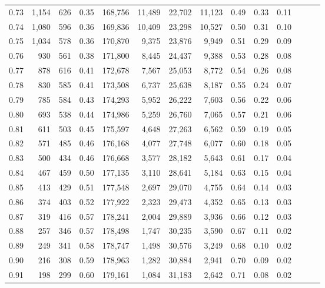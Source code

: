 \begin{tabular}{rrrrrrrrrrrrrr}
0.73 &  1,154 &  626 &  0.35 &  168,756 &   11,489 &  22,702 &  11,123 &  0.49 &  0.33 &      0.11 \\
0.74 &  1,080 &  596 &  0.36 &  169,836 &   10,409 &  23,298 &  10,527 &  0.50 &  0.31 &      0.10 \\
0.75 &  1,034 &  578 &  0.36 &  170,870 &    9,375 &  23,876 &   9,949 &  0.51 &  0.29 &      0.09 \\
0.76 &    930 &  561 &  0.38 &  171,800 &    8,445 &  24,437 &   9,388 &  0.53 &  0.28 &      0.08 \\
0.77 &    878 &  616 &  0.41 &  172,678 &    7,567 &  25,053 &   8,772 &  0.54 &  0.26 &      0.08 \\
0.78 &    830 &  585 &  0.41 &  173,508 &    6,737 &  25,638 &   8,187 &  0.55 &  0.24 &      0.07 \\
0.79 &    785 &  584 &  0.43 &  174,293 &    5,952 &  26,222 &   7,603 &  0.56 &  0.22 &      0.06 \\
0.80 &    693 &  538 &  0.44 &  174,986 &    5,259 &  26,760 &   7,065 &  0.57 &  0.21 &      0.06 \\
0.81 &    611 &  503 &  0.45 &  175,597 &    4,648 &  27,263 &   6,562 &  0.59 &  0.19 &      0.05 \\
0.82 &    571 &  485 &  0.46 &  176,168 &    4,077 &  27,748 &   6,077 &  0.60 &  0.18 &      0.05 \\
0.83 &    500 &  434 &  0.46 &  176,668 &    3,577 &  28,182 &   5,643 &  0.61 &  0.17 &      0.04 \\
0.84 &    467 &  459 &  0.50 &  177,135 &    3,110 &  28,641 &   5,184 &  0.63 &  0.15 &      0.04 \\
0.85 &    413 &  429 &  0.51 &  177,548 &    2,697 &  29,070 &   4,755 &  0.64 &  0.14 &      0.03 \\
0.86 &    374 &  403 &  0.52 &  177,922 &    2,323 &  29,473 &   4,352 &  0.65 &  0.13 &      0.03 \\
0.87 &    319 &  416 &  0.57 &  178,241 &    2,004 &  29,889 &   3,936 &  0.66 &  0.12 &      0.03 \\
0.88 &    257 &  346 &  0.57 &  178,498 &    1,747 &  30,235 &   3,590 &  0.67 &  0.11 &      0.02 \\
0.89 &    249 &  341 &  0.58 &  178,747 &    1,498 &  30,576 &   3,249 &  0.68 &  0.10 &      0.02 \\
0.90 &    216 &  308 &  0.59 &  178,963 &    1,282 &  30,884 &   2,941 &  0.70 &  0.09 &      0.02 \\
0.91 &    198 &  299 &  0.60 &  179,161 &    1,084 &  31,183 &   2,642 &  0.71 &  0.08 &      0.02 \\

\end{tabular}
